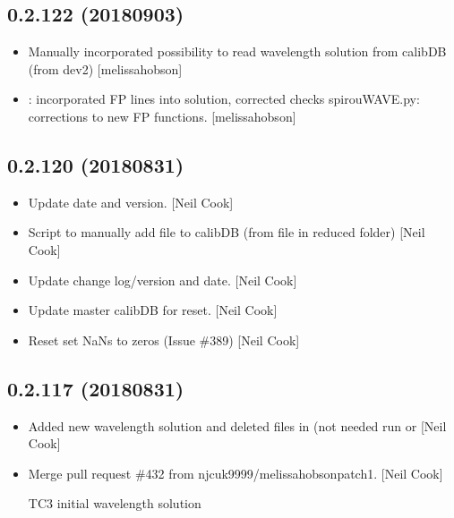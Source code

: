 \documentclass[a4paper,10pt,english]{report}
\begin{document}
\subsection{0.2.122 (2018\sphinxhyphen{}09\sphinxhyphen{}03)}
\label{\detokenize{misc/changelog:id361}}\begin{itemize}
\item {} 
Manually incorporated possibility to read wavelength solution from
calibDB (from dev2) {[}melissa\sphinxhyphen{}hobson{]}

\item {} 
: incorporated FP lines into solution,
corrected checks spirouWAVE.py: corrections to new FP functions.
{[}melissa\sphinxhyphen{}hobson{]}

\end{itemize}


\subsection{0.2.120 (2018\sphinxhyphen{}08\sphinxhyphen{}31)}
\label{\detokenize{misc/changelog:id362}}\begin{itemize}
\item {} 
Update date and version. {[}Neil Cook{]}

\item {} 
Script to manually add file to calibDB (from file in reduced folder)
{[}Neil Cook{]}

\item {} 
Update change log/version and date. {[}Neil Cook{]}

\item {} 
Update master calibDB for reset. {[}Neil Cook{]}

\item {} 
Reset  set NaNs to zeros (Issue \#389) {[}Neil Cook{]}

\end{itemize}


\subsection{0.2.117 (2018\sphinxhyphen{}08\sphinxhyphen{}31)}
\label{\detokenize{misc/changelog:id363}}\begin{itemize}
\item {} 
Added new wavelength solution and deleted files in  (not
needed \sphinxhyphen{} run  or  {[}Neil Cook{]}

\item {} 
Merge pull request \#432 from njcuk9999/melissa\sphinxhyphen{}hobson\sphinxhyphen{}patch\sphinxhyphen{}1. {[}Neil
Cook{]}

TC3 initial wavelength solution

\end{itemize}
\end{document}
